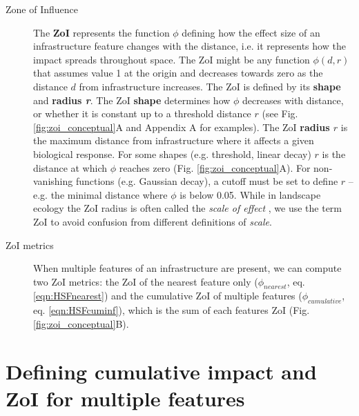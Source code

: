 \documentclass[titlepage]{article}
\begin{document}
\begin{tcolorbox}[width=1.3\textwidth,center,colback=yellow!5,colframe=yellow!75!black,title={Box 1 -- Definitions}]
\begin{description}
    \item[Zone of Influence] The \textbf{ZoI} represents the function $\phi$ defining how the effect size of an infrastructure feature changes with the distance, i.e. it represents how the impact spreads throughout space. The ZoI might be any function $\phi(d, r)$ that assumes value 1 at the origin and decreases towards zero as the distance $d$ from infrastructure increases. The ZoI is defined by its \textbf{shape} and \textbf{radius \textit{r}}. The ZoI \textbf{shape} determines how $\phi$ decreases with distance, or whether it is constant up to a threshold distance $r$ (see Fig. \ref{fig:zoi_conceptual}A and Appendix A for examples). The ZoI \textbf{radius $r$} is the maximum distance from infrastructure where it affects a given biological response. For some shapes (e.g. threshold, linear decay) $r$ is the distance at which $\phi$ reaches zero (Fig. \ref{fig:zoi_conceptual}A). For non-vanishing functions (e.g. Gaussian decay), a cutoff must be set to define $r$ -- e.g. the minimal distance where $\phi$ is below 0.05. 
    While in landscape ecology the ZoI radius is often called the \textit{scale of effect} \citep[e.g.][]{jackson_are_2015}, we use the term ZoI to avoid confusion from different definitions of \textit{scale}.
    
    \item[ZoI metrics] When multiple features of an infrastructure are present, we can compute two ZoI metrics: the ZoI of the nearest feature only ($\phi_{nearest}$, eq. \ref{eqn:HSFnearest}) and the cumulative ZoI of multiple features ($\phi_{cumulative}$, eq. \ref{eqn:HSFcuminf}), which is the sum of each features ZoI (Fig. \ref{fig:zoi_conceptual}B).
    
\end{description}
\end{tcolorbox}

\section{Defining cumulative impact and ZoI for multiple features}
\end{document}
